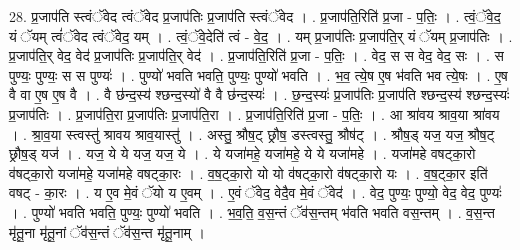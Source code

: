\documentclass[17pt]{extarticle}
\begin{document}
28. प्र॒जाप॑ति स्त्वंॅवेद त्वंॅवेद प्र॒जाप॑तिः प्र॒जाप॑ति स्त्वंॅवेद । . प्र॒जाप॑ति॒रिति॑ प्र॒जा - प॒तिः॒ । . त्वं॒ॅवे॒द॒ यं ॅयम् त्वं॑ॅवेद त्वंॅवेद॒ यम् । . त्वं॒ॅवे॒देति॑ त्वं - वे॒द॒ । . यम् प्र॒जाप॑तिः प्र॒जाप॑ति॒र् यं ॅयम् प्र॒जाप॑तिः । . प्र॒जाप॑ति॒र् वेद॒ वेद॑ प्र॒जाप॑तिः प्र॒जाप॑ति॒र् वेद॑ । . प्र॒जाप॑ति॒रिति॑ प्र॒जा - प॒तिः॒ । . वेद॒ स स वेद॒ वेद॒ सः । . स पुण्यः॒ पुण्यः॒ स स पुण्यः॑ । . पुण्यो॑ भवति भवति॒ पुण्यः॒ पुण्यो॑ भवति । . भ॒व॒ त्ये॒ष ए॒ष भ॑वति भव त्ये॒षः । . ए॒ष वै वा ए॒ष ए॒ष वै । . वै छ॑न्द॒स्य॑ श्छन्द॒स्यो॑ वै वै छ॑न्द॒स्यः॑ । . छ॒न्द॒स्यः॑ प्र॒जाप॑तिः प्र॒जाप॑ति श्छन्द॒स्य॑ श्छन्द॒स्यः॑ प्र॒जाप॑तिः । . प्र॒जाप॑ति॒रा प्र॒जाप॑तिः प्र॒जाप॑ति॒रा । . प्र॒जाप॑ति॒रिति॑ प्र॒जा - प॒तिः॒ । . आ श्रा॑वय श्राव॒या श्रा॑वय । . श्रा॒व॒या स्त्वस्तु॑ श्रावय श्राव॒यास्तु॑ । . अस्तु॒ श्रौष॒ट् छ्रौष॒ डस्त्वस्तु॒ श्रौष॑ट् । . श्रौष॒ड् यज॒ यज॒ श्रौष॒ट् छ्रौष॒ड् यज॑ । . यज॒ ये ये यज॒ यज॒ ये । . ये यजा॑महे॒ यजा॑महे॒ ये ये यजा॑महे । . यजा॑महे वषट्का॒रो व॑षट्का॒रो यजा॑महे॒ यजा॑महे वषट्का॒रः । . व॒ष॒ट्का॒रो यो यो व॑षट्का॒रो व॑षट्का॒रो यः । . व॒ष॒ट्का॒र इति॑ वषट् - का॒रः । . य ए॒व मे॒वं ॅयो य ए॒वम् । . ए॒वं ॅवेद॒ वेदै॒व मे॒वं ॅवेद॑ । . वेद॒ पुण्यः॒ पुण्यो॒ वेद॒ वेद॒ पुण्यः॑ । . पुण्यो॑ भवति भवति॒ पुण्यः॒ पुण्यो॑ भवति । . भ॒व॒ति॒ व॒स॒न्तं ॅव॑स॒न्तम् भ॑वति भवति वस॒न्तम् । . व॒स॒न्त मृ॑तू॒ना मृ॑तू॒नां ॅव॑स॒न्तं ॅव॑स॒न्त मृ॑तू॒नाम् । \newline
\end{document}
